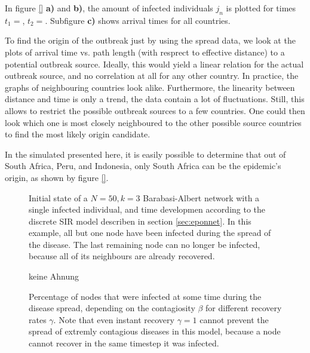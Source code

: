 \documentclass{scrartcl}
\begin{document}
In figure \ref{} \textbf{a)} and \textbf{b)}, the amount of infected individuals $j_n$ is plotted for times $t_1=$, $t_2 = $. Subfigure \textbf{c)} shows arrival times for all countries.

To find the origin of the outbreak just by using the spread data, we look at the plots of arrival time vs. path length (with resprect to effective distance) to a potential outbreak source. 
Ideally, this would yield a linear relation for the actual outbreak source, and no correlation at all for any other country. In practice, the graphs of neighbouring countries look alike. 
Furthermore, the linearity between distance and time is only a trend, the data contain a lot of fluctuations.
Still, this allows to restrict the possible outbreak sources to a few countries. One could then look which one is most closely neighboured to the other possible source countries to find the most likely origin candidate.

In the simulated presented here, it is easily possible to determine that out of South Africa, Peru, and Indonesia, only South Africa can be the epidemic's origin, as shown by figure \ref{}.
\begin{figure}
    \centering
    \def\svgwidth{0.9\textwidth}
    
    \caption{Initial state of a $N=50, k=3$ Barabasi-Albert network with a single infected individual, and time developmen according to the discrete SIR model describen in section \ref{sec:eponnet}. In this example, all but one node have been infected during the spread of the disease. The last remaining node can no longer be infected, because all of its neighbours are already recovered.}
    \label{fig:D11}
\end{figure}


\begin{figure}
    \centering
    \def\svgwidth{1.0\textwidth}
    
    \caption{keine Ahnung}
    \label{fig:XXXXXX}
\end{figure}

\begin{figure}
    \centering
    \caption{Percentage of nodes that were infected at some time during the disease spread, 
		depending on the contagiosity $\beta$ for different recovery rates $\gamma$. Note that 
		even instant recovery $\gamma=1$ cannot prevent the spread of extremly contagious diseases
		in this model, because a node cannot recover in the same timestep it was infected.}
    \label{fig:D12}
\end{figure}
\end{document}
